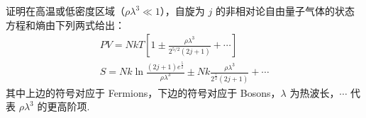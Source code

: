 \documentclass{assignment}
\begin{document}
\begin{prob}
    证明在高温或低密度区域（$\rho\lambda^3\ll 1$），自旋为 $j$ 的非相对论自由量子气体的状态方程和熵由下列两式给出：
    \begin{gather*}
        PV=NkT\left[1\pm\frac{\rho\lambda^3}{2^{5/2}(2j+1)}+\cdots\right]\\
        S=Nk\ln\frac{(2j+1)e^{\frac{5}{2}}}{\rho\lambda^3}\pm Nk\frac{\rho\lambda^3}{2^{\frac{7}{2}}(2j+1)}+\cdots
    \end{gather*}
    其中上边的符号对应于 Fermions，下边的符号对应于 Bosons，$\lambda$ 为热波长，$\cdots$ 代表 $\rho\lambda^3$ 的更高阶项.
\end{prob}
\begin{pf}
    
\end{pf}
\end{document}
